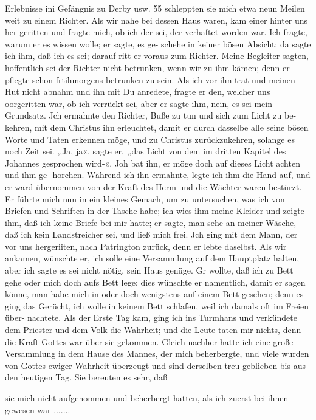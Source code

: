 Erlebnisse ini Gefängnis zu Derby usw. 55
schleppten sie mich etwa neun Meilen weit zu einem Richter.
Als wir nahe bei dessen Haus waren, kam einer hinter uns her
geritten und fragte mich, ob ich der sei, der verhaftet worden
war. Ich fragte, warum er es wissen wolle; er sagte, es ge-
schehe in keiner bösen Absicht; da sagte ich ihm, daß ich es
sei; darauf ritt er voraus zum Richter. Meine Begleiter sagten,
hoffentlich sei der Richter nicht betrunken, wenn wir zu ihm
kämen; denn er pflegte schon frtihmorgens betrunken zu sein.
Als ich vor ihn trat und meinen Hut nicht abnahm und ihn mit
Du anredete, fragte er den, welcher uns oorgeritten war, ob ich
verrückt sei, aber er sagte ihm, nein, es sei mein Grundsatz. Jch
ermahnte den Richter, Buße zu tun und sich zum Licht zu be-
kehren, mit dem Christus ihn erleuchtet, damit er durch dasselbe
alle seine bösen Worte und Taten erkennen möge, und zu Christus
zurückzukehren, solange es noch Zeit sei. ,,Ja, ja«, sagte er, ,,das
Licht von dem im dritten Kapitel des Johannes gesprochen wird-«.
Joh bat ihn, er möge doch auf dieses Licht achten und ihm ge-
horchen. Während ich ihn ermahnte, legte ich ihm die Hand auf,
und er ward übernommen von der Kraft des Herm und die
Wächter waren bestürzt. Er führte mich nun in ein kleines Gemach,
um zu untersuchen, was ich von Briefen und Schriften in der
Tasche habe; ich wies ihm meine Kleider und zeigte ihm, daß
ich keine Briefe bei mir hatte; er sagte, man sehe an meiner
Wäsche, daß ich kein Landstreicher sei, und ließ mich frei. Jch
ging mit dem Mann, der vor uns hergeriiten, nach Patrington
zurück, denn er lebte daselbst. Als wir ankamen, wünschte er, ich
solle eine Versammlung auf dem Hauptplatz halten, aber ich sagte
es sei nicht nötig, sein Haus genüge. Gr wollte, daß ich zu Bett
gehe oder mich doch aufs Bett lege; dies wünschte er namentlich,
damit er sagen könne, man habe mich in oder doch wenigstens
auf einem Bett gesehen; denn es ging das Gerücht, ich wolle
in keinem Bett schlafen, weil ich damals oft im Freien über-
nachtete. Als der Erste Tag kam, ging ich ins Turmhans
und verkündete dem Priester und dem Volk die Wahrheit; und
die Leute taten mir nichts, denn die Kraft Gottes war über sie
gekommen. Gleich nachher hatte ich eine große Versammlung in
dem Hause des Mannes, der mich beherbergte, und viele wurden
von Gottes ewiger Wahrheit überzeugt und sind derselben treu
geblieben bis aus den heutigen Tag. Sie bereuten es sehr, daß


sie mich nicht aufgenommen und beherbergt hatten, als ich zuerst
bei ihnen gewesen war .......


